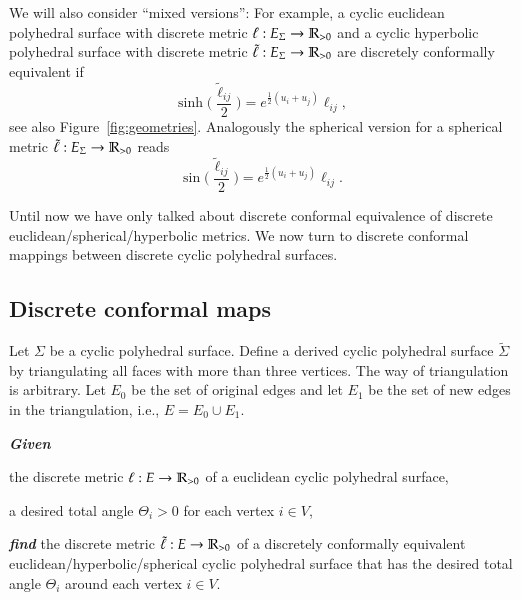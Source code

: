 \documentclass[Thesis]{subfiles}
\begin{document}
We will also consider ``mixed versions'': For example, a cyclic
euclidean polyhedral surface with discrete metric
$\ell:E_{\Sigma}\rightarrow\mathbb R_{>0}$ and a cyclic hyperbolic polyhedral
surface with discrete metric $\tilde\ell:E_{\Sigma}\rightarrow\mathbb R_{>0}$
are discretely conformally equivalent if
\begin{equation*}
\sinh\Big(\frac{\tilde\ell_\mathit{ij}}{2}\Big)
= e^{\frac{1}{2}(u_{i}+u_{j})}\ell_\mathit{ij},
\end{equation*}
see also Figure~\ref{fig:geometries}. 
Analogously the spherical version for a spherical metric $\tilde\ell:E_{\Sigma}\rightarrow\mathbb R_{>0}$ reads
\begin{equation*}
\sin\Big(\frac{\tilde\ell_\mathit{ij}}{2}\Big)
= e^{\frac{1}{2}(u_{i}+u_{j})}\ell_\mathit{ij}.
\end{equation*}

Until now we have only talked about discrete conformal equivalence of discrete euclidean/spherical/hyperbolic metrics.
We now turn to discrete conformal mappings between discrete cyclic polyhedral surfaces.

\subsection{Discrete conformal maps}

Let $\Sigma$ be a cyclic polyhedral surface. Define a derived cyclic polyhedral
surface $\tilde \Sigma$ by triangulating all faces with more than three vertices. The way of triangulation
is arbitrary. Let $E_0$ be the set of original edges and let $E_1$ be the set of new edges
in the triangulation, i.e., $E=E_0\cup E_1$.

\begin{problem}
\label{prob:total_angles}
\textbf{\itshape{Given}}

\begin{compactitem}
\item the discrete metric $\ell:E\rightarrow\mathbb R_{>0}$ of a
euclidean cyclic polyhedral surface,
\item a desired total angle $\Theta_{i}>0$ for each vertex
$i\in V$,
\end{compactitem}

\smallskip\noindent%
\textbf{\itshape{find}} the discrete metric
$\tilde\ell:E\rightarrow\mathbb R_{>0}$ of a discretely
conformally equivalent euclidean/hyperbolic/spherical cyclic polyhedral surface that has
the desired total angle $\Theta_{i}$ around each vertex $i\in
V$.
\end{problem}
\end{document}
